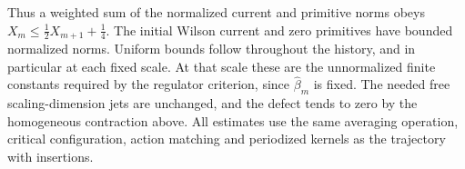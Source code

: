 Thus a weighted sum of the normalized current and primitive norms obeys
$X_m\le\frac12X_{m+1}+\frac14$. The initial Wilson current and zero
primitives have bounded normalized norms. Uniform bounds follow throughout
the history, and in particular at each fixed scale. At that scale
these are the unnormalized finite constants required by the regulator
criterion, since $\widehat\beta_m$ is fixed. The needed free scaling-dimension
jets are unchanged, and the defect tends to zero by the homogeneous
contraction above. All estimates use the same averaging operation, critical
configuration, action matching and periodized kernels as the trajectory with insertions.
